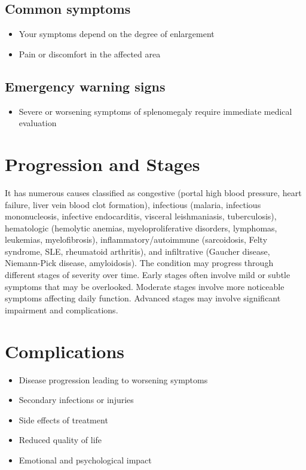 \subsection{Common symptoms}
\begin{itemize}[noitemsep]
  \item Your symptoms depend on the degree of enlargement
  \item Pain or discomfort in the affected area
  \end{itemize}

\subsection{Emergency warning signs}
\begin{itemize}[noitemsep]
  \item Severe or worsening symptoms of splenomegaly require immediate medical evaluation
\end{itemize}
\section{Progression and Stages}
It has numerous causes classified as congestive (portal high blood pressure, heart failure, liver vein blood clot formation), infectious (malaria, infectious mononucleosis, infective endocarditis, visceral leishmaniasis, tuberculosis), hematologic (hemolytic anemias, myeloproliferative disorders, lymphomas, leukemias, myelofibrosis), inflammatory/autoimmune (sarcoidosis, Felty syndrome, SLE, rheumatoid arthritis), and infiltrative (Gaucher disease, Niemann-Pick disease, amyloidosis). The condition may progress through different stages of severity over time. Early stages often involve mild or subtle symptoms that may be overlooked. Moderate stages involve more noticeable symptoms affecting daily function. Advanced stages may involve significant impairment and complications.
\section{Complications}
\begin{itemize}[noitemsep]
  \item Disease progression leading to worsening symptoms
  \item Secondary infections or injuries
  \item Side effects of treatment
  \item Reduced quality of life
  \item Emotional and psychological impact
\end{itemize}
